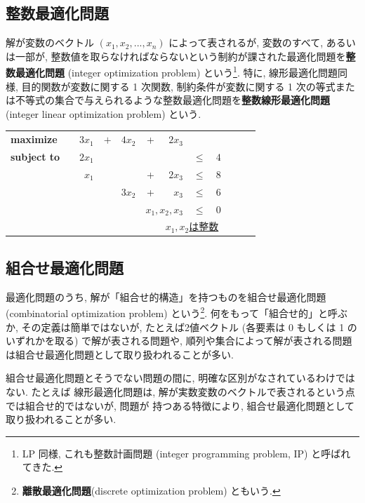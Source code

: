 \documentclass[a4paper,11pt,dvipdfmx]{jsarticle}
\begin{document}
\subsection{整数最適化問題}
解が変数のベクトル $(x_1,x_2,...,x_n)$ によって表されるが, 変数のすべて, あるいは一部が, 整数値を取らなければならないという制約が課された最適化問題を\textbf{整数最適化問題} (integer optimization problem) という\footnote{ LP 同様, これも整数計画問題 (integer programming problem, IP) と呼ばれてきた.}. 
特に, 線形最適化問題同様, 目的関数が変数に関する 1 次関数, 制約条件が変数に関する 1 次の等式または不等式の集合で与えられるような整数最適化問題を\textbf{整数線形最適化問題} (integer linear optimization problem) という.
\begin{shadebox}
    \centering
    \begin{tabular}{l c r c r c r c c l l l}
        \textbf{maximize}   &  & $3x_1$ & $+$ & $4x_2$ & +              & $2x_3$             &      &   &  &  &  \\
        \textbf{subject to} &  & $2x_1$ &     &        &                &                    & $\leq$ & $4$ &  &  &  \\
                            &  & $x_1$  &     &        & +              & $2x_3$             & $\leq$ & $8$ &  &  &  \\
                            &  &        &     & $3x_2$ & +              & $x_3$              & $\leq$ & $6$ &  &  &  \\
                            &  &        &     &        & \multicolumn{2}{l}{$x_1, x_2, x_3$} & $\leq$ & $0$ &  &  & \\
                            &&&&&&\multicolumn{3}{l}{\underline{$x_1,x_2$は整数}}&&&
    \end{tabular}
\end{shadebox}

\subsection{組合せ最適化問題}
最適化問題のうち, 解が「組合せ的構造」を持つものを組合せ最適化問題 (combinatorial optimization problem) という\footnote{\textbf{離散最適化問題}(discrete optimization problem) ともいう.}. 
何をもって「組合せ的」と呼ぶか, その定義は簡単ではないが, たとえば2値ベクトル (各要素は 0 もしくは 1 のいずれかを取る) で解が表される問題や, 順列や集合によって解が表される問題は組合せ最適化問題として取り扱われることが多い.

組合せ最適化問題とそうでない問題の間に, 明確な区別がなされているわけではない. たとえば 線形最適化問題は, 解が実数変数のベクトルで表されるという点では組合せ的ではないが, 問題が 持つある特徴により, 組合せ最適化問題として取り扱われることが多い.
\end{document}
